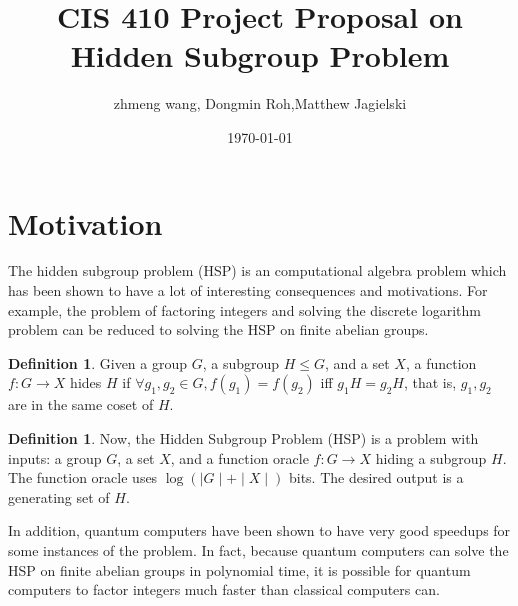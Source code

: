 \documentclass[dvips,12pt]{article}
\theoremstyle{plain}
\theoremstyle{definition}
\newtheorem{defn}[thm]{Definition} %
\begin{document}

\title{CIS 410 Project Proposal on Hidden Subgroup Problem}
\author{zhmeng wang, Dongmin Roh,Matthew Jagielski}
\date{\today}



\maketitle


\section{Motivation}

The hidden subgroup problem (HSP) is an computational algebra problem which has been shown to have a lot of interesting consequences and motivations. For example, the problem of factoring integers and solving the discrete logarithm problem can be reduced to solving the HSP on finite abelian groups.

\begin{defn}
Given a group $G$, a subgroup $H\le G$, and a set $X$, a function $f:G\rightarrow X$ hides $H$ if $\forall g_1,g_2\in G, f(g_1)=f(g_2)$ iff $g_1H=g_2H$, that is, $g_1,g_2$ are in the same coset of $H$.
\end{defn}

\begin{defn}
Now, the Hidden Subgroup Problem (HSP) is a problem with inputs: a group $G$, a set $X$, and a function oracle $f: G\rightarrow X$ hiding a subgroup $H$. The function oracle uses $\log(\mid G\mid + \mid X\mid)$ bits. The desired output is a generating set of $H$.
\end{defn}

In addition, quantum computers have been shown to have very good speedups for some instances of the problem. In fact, because quantum computers can solve the HSP on finite abelian groups in polynomial time, it is possible for quantum computers to factor integers much faster than classical computers can.\\
\end{document}
